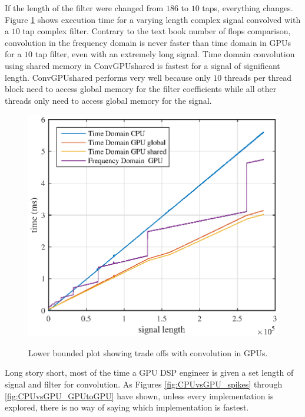 If the length of the filter were changed from $186$ to $10$ taps, everything changes.
Figure \ref{fig:taps10CPUvsGPU} shows execution time for a varying length complex signal convolved with a $10$ tap complex filter.
Contrary to the text book number of flops comparison, convolution in the frequency domain is never faster than time domain in GPUs for a $10$ tap filter, even with an extremely long signal.
Time domain convolution using shared memory in ConvGPUshared is fastest for a signal of significant length.
ConvGPUshared performs very well because only $10$ threads per thread block need to access global memory for the filter coefficients while all other threads only need to access global memory for the signal.
\begin{figure}
	\caption{Lower bounded plot showing trade offs with convolution in GPUs.}
	\centering\includegraphics[width=5in]{figures/gpu_intro/taps10CPUvsGPU.eps}
	\label{fig:taps10CPUvsGPU}
\end{figure}

Long story short, most of the time a GPU DSP engineer is given a set length of signal and filter for convolution.
As Figures \ref{fig:CPUvsGPU_spikes} through \ref{fig:CPUvsGPU_GPUtoGPU} have shown, unless every implementation is explored, there is no way of saying which implementation is fastest.

